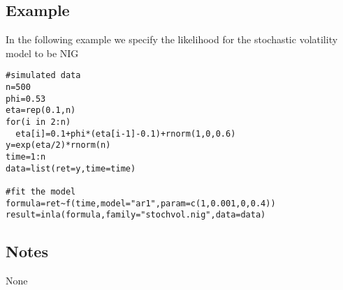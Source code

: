 \documentclass[a4paper,11pt]{article}
\begin{document}
\subsection*{Example}
In the following example we specify the likelihood for the stochastic volatility model to be NIG 
 
\begin{verbatim}
#simulated data
n=500
phi=0.53
eta=rep(0.1,n)
for(i in 2:n)
  eta[i]=0.1+phi*(eta[i-1]-0.1)+rnorm(1,0,0.6)
y=exp(eta/2)*rnorm(n)
time=1:n
data=list(ret=y,time=time)

#fit the model
formula=ret~f(time,model="ar1",param=c(1,0.001,0,0.4))
result=inla(formula,family="stochvol.nig",data=data)

\end{verbatim}

\subsection*{Notes}

None
\end{document}
